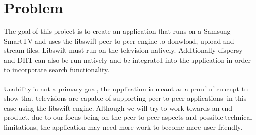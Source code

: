 \chapter{Problem}

The goal of this project is to create an application that runs on a Samsung SmartTV and uses the libswift peer-to-peer engine to donwload, upload and stream files. Libswift must run on the television natively. Additionally dispersy and DHT can also be run natively and be integrated into the application in order to incorporate search functionality.
\\\\
Usability is not a primary goal, the application is meant as a proof of concept to show that televisions are capable of supporting peer-to-peer applications, in this case using the libswift engine. Although we will try to work towards an end product, due to our focus being on the peer-to-peer aspects and possible technical limitations, the application may need more work to become more user friendly.